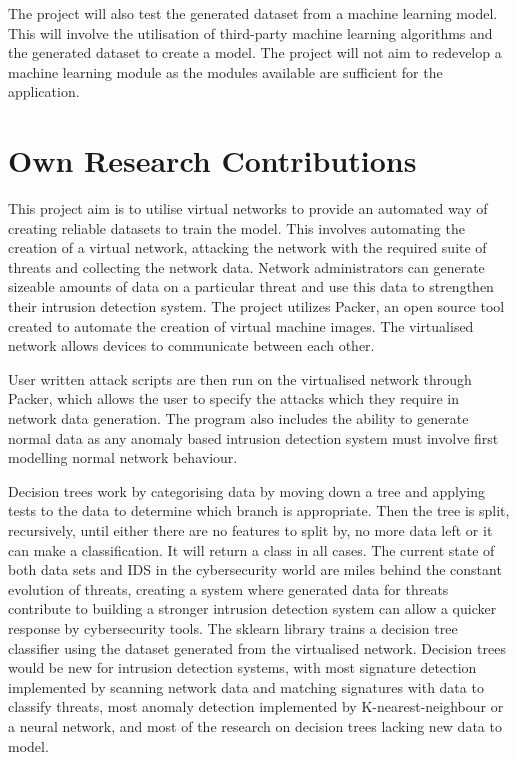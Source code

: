 The project will also test the generated dataset from a machine learning model. This will involve the utilisation of third-party machine learning algorithms and the generated dataset to create a model. The project will not aim to redevelop a machine learning module as the modules available are sufficient for the application.

\section{Own Research Contributions}

This project aim is to utilise virtual networks to provide an automated way of creating reliable datasets to train the model. This involves automating the creation of a virtual network, attacking the network with the required suite of threats and collecting the network data. Network administrators can generate sizeable amounts of data on a particular threat and use this data to strengthen their intrusion detection system. The project utilizes Packer, an open source tool created to automate the creation of virtual machine images. The virtualised network allows devices to communicate between each other. 

User written attack scripts are then run on the virtualised network through Packer, which allows the user to specify the attacks which they require in network data generation. The program also includes the ability to generate normal data as any anomaly based intrusion detection system must involve first modelling normal network behaviour.

Decision trees work by categorising data by moving down a tree and applying tests to the data to determine which branch is appropriate. Then the tree is split, recursively, until either there are no features to split by, no more data left or it can make a classification. It will return a class in all cases. The current state of both data sets and IDS in the cybersecurity world are miles behind the constant evolution of threats, creating a system where generated data for threats contribute to building a stronger intrusion detection system can allow a quicker response by cybersecurity tools. The sklearn library trains a decision tree classifier using the dataset generated from the virtualised network. Decision trees would be new for intrusion detection systems, with most signature detection implemented by scanning network data and matching signatures with data to classify threats, most anomaly detection implemented by K-nearest-neighbour or a neural network, and most of the research on decision trees lacking new data to model. 